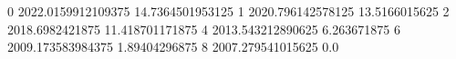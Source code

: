 0 2022.0159912109375 14.7364501953125
1 2020.796142578125 13.5166015625
2 2018.6982421875 11.418701171875
4 2013.543212890625 6.263671875
6 2009.173583984375 1.89404296875
8 2007.279541015625 0.0
